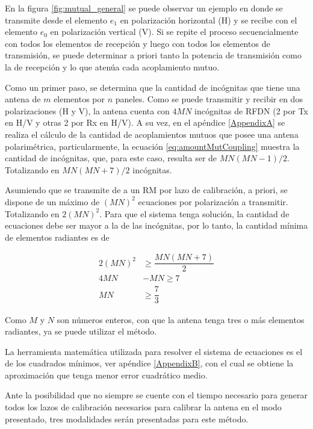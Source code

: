 En la figura \ref{fig:mutual_general} se puede observar un ejemplo en donde se transmite desde el elemento $e_1$ en 
polarización horizontal (H) y se recibe con el elemento $e_0$ en polarización vertical (V). Si se repite el proceso
secuencialmente con todos los elementos de recepción y luego con todos los elementos de transmisión, se puede determinar a
priori tanto la potencia de transmisión como la de recepción y lo que atenúa cada acoplamiento mutuo.

Como un primer paso, se determina que la cantidad de incógnitas que tiene una antena de $m$ elementos por $n$ paneles. Como
se puede transmitir y recibir en dos polarizaciones (H y V), la antena cuenta con $4MN$ incógnitas de RFDN (2 por Tx en H/V y
otras 2 por Rx en H/V). A su vez, en el apéndice \ref{AppendixA} se realiza el cálculo de la cantidad de acoplamientos mutuos
que posee una antena polarimétrica, particularmente, la ecuación \ref{eq:amountMutCoupling} muestra la cantidad de
incógnitas, que, para este caso, resulta ser de $MN(MN-1)/2$. Totalizando en $MN(MN + 7)/2$ incógnitas.

Asumiendo que se transmite de a un RM por lazo de calibración, a priori, se dispone de un máximo de $(MN)^2$ ecuaciones por
polarización a transmitir. Totalizando en $2(MN)^2$. Para que el sistema tenga solución, la cantidad de ecuaciones debe ser
mayor a la de las incógnitas, por lo tanto, la cantidad mínima de elementos radiantes es de

$$
\begin{aligned}
	2(MN)^2 &\ge  \dfrac{MN(MN + 7)}{2} \\
	4MN &- MN \ge7 \\
	MN &\ge \dfrac{7}{3}
\end{aligned}
$$

Como $M$ y $N$ son números enteros, con que la antena tenga tres o más elementos radiantes, ya se puede utilizar el método.

La herramienta matemática utilizada para resolver el sistema de ecuaciones es el de los cuadrados mínimos,
ver apéndice \ref{AppendixB}, con el cual se obtiene la aproximación que tenga menor error cuadrático medio.

Ante la posibilidad que no siempre se cuente con el tiempo necesario para generar todos los lazos de calibración necesarios
para calibrar la antena en el modo presentado, tres modalidades serán presentadas para este método.

